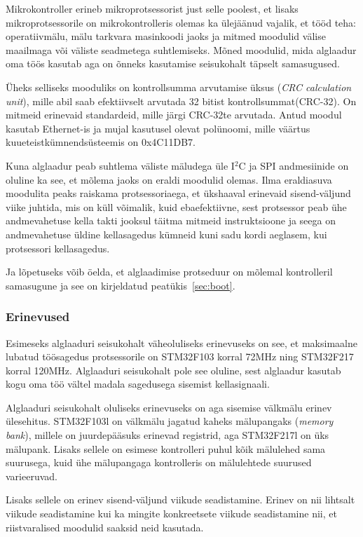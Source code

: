 \documentclass[12pt,a4paper]{article}
\newcommand{\iic}{I${}^2$C }
\begin{document}
Mikrokontroller erineb mikroprotsessorist just selle poolest, et lisaks
mikroprotsessorile on mikrokontrolleris olemas ka ülejäänud vajalik, et tööd
teha: operatiivmälu, mälu tarkvara masinkoodi jaoks ja mitmed moodulid välise
maailmaga või väliste seadmetega suhtlemiseks. Mõned moodulid, mida alglaadur
oma töös kasutab aga on õnneks kasutamise seisukohalt täpselt samasugused.

Üheks selliseks mooduliks on kontrollsumma arvutamise üksus (\textit{CRC
calculation unit}), mille abil saab efektiivselt arvutada 32 bitist
kontrollsummat(CRC-32). On mitmeid erinevaid standardeid, mille järgi CRC-32te
arvutada. Antud moodul kasutab Ethernet-is ja mujal kasutusel olevat polünoomi,
mille väärtus kuueteistkümnendsüsteemis on 0x4C11DB7. 

Kuna alglaadur peab suhtlema väliste mäludega üle \iic ja SPI andmesiinide on
oluline ka see, et mõlema jaoks on eraldi moodulid olemas. Ilma eraldiasuva
moodulita peaks raiskama protsessoriaega, et ükshaaval erinevaid sisend-väljund
viike juhtida, mis on küll võimalik, kuid ebaefektiivne, sest protsessor peab
ühe andmevahetuse kella takti jooksul täitma mitmeid instruktsioone ja seega
on andmevahetuse üldine kellasagedus kümneid kuni sadu kordi aeglasem, kui
protsessori kellasagedus.

Ja lõpetuseks võib öelda, et alglaadimise protseduur on mõlemal kontrolleril
samasugune ja see on kirjeldatud peatükis~\ref{sec:boot}.

\subsubsection{Erinevused}
Esimeseks alglaaduri seisukohalt väheoluliseks erinevuseks on see, et
maksimaalne lubatud töösagedus protsessorile on STM32F103 korral 72MHz ning
STM32F217 korral 120MHz. Alglaaduri seisukohalt pole see oluline, sest alglaadur
kasutab kogu oma töö vältel madala sagedusega sisemist kellasignaali.

Alglaaduri seisukohalt oluliseks erinevuseks on aga sisemise välkmälu erinev
ülesehitus. STM32F103l on välkmälu jagatud kaheks mälupangaks (\textit{memory
bank}), millele on juurdepääsuks erinevad registrid, aga STM32F217l on üks
mälupank. Lisaks sellele on esimese kontrolleri puhul kõik mälulehed sama
suurusega, kuid ühe mälupangaga kontrolleris on mälulehtede suurused
varieeruvad. \cite{f1fpm,f2fpm}

Lisaks sellele on erinev sisend-väljund viikude seadistamine. Erinev on nii
lihtsalt viikude seadistamine kui ka mingite konkreetsete viikude seadistamine
nii, et riistvaralised moodulid saaksid neid kasutada.
\end{document}
